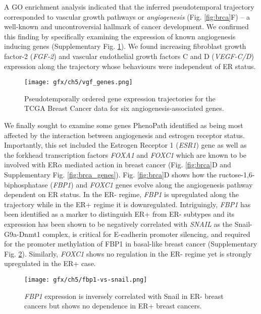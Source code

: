 A GO enrichment analysis indicated that the inferred pseudotemporal trajectory corresponded to vascular growth pathways or \emph{angiogenesis} (Fig. \ref{fig:brca}F) -- a well-known and uncontroversial hallmark of cancer development.\cite{ferrara2002vegf,welti2013recent} We confirmed this finding by specifically examining the expression of known angiogenesis inducing genes (Supplementary Fig. \ref{fig:vgf_genes}). We found increasing fibroblast growth factor-2 (\emph{FGF-2}) and vascular endothelial growth factors C and D (\emph{VEGF-C/D}) expression along the trajectory whose behaviours were independent of ER status.

\begin{figure}
   \texttt{[image: gfx/ch5/vgf\_genes.png]}
   \caption{Pseudotemporally ordered gene expression trajectories for the TCGA Breast Cancer data for six angiogenesis-associated genes.}
	\label{fig:vgf_genes}
\end{figure}

We finally sought to examine some genes PhenoPath identified as being most affected by the interaction between angiogenesis and estrogen receptor status.
Importantly, this set included the Estrogen Receptor 1 (\emph{ESR1})
gene as well as the forkhead transcription factors \emph{FOXA1} and \emph{FOXC1} which are known to be involved with ER$\alpha$ mediated action in breast cancer \cite{lam2013forkhead,yu2016foxc1} (Fig. \ref{fig:brca}D and Supplementary Fig. \ref{fig:brca_genes}).
Fig. \ref{fig:brca}D shows how the  ructose-1,6-biphosphatase (\emph{FBP1}) and \emph{FOXC1} genes evolve along the angiogenesis pathway dependent on ER status. In the ER- regime, \emph{FBP1} is upregulated along the trajectory while in the ER+ regime it is downregulated. Intriguingly, \emph{FBP1} has been identified as a marker to distinguish ER+ from ER- subtypes and its expression has been shown to be negatively correlated with \emph{SNAIL} as the Snail-G9a-Dnmt1 complex, is critical for E-cadherin promoter silencing, and required for the promoter methylation of FBP1 in basal-like breast cancer (Supplementary Fig. \ref{fig:fbp1-vs-snail}).\cite{dong2013loss} Similarly, \emph{FOXC1} shows no regulation in the ER- regime yet is strongly upregulated in the ER+ case.

\begin{figure}
  \centering
   \texttt{[image: gfx/ch5/fbp1-vs-snail.png]}
   \caption{\emph{FBP1} expression is inversely correlated with Snail in ER- breast cancers but shows no dependence in ER+ breast cancers.}
	\label{fig:fbp1-vs-snail}
\end{figure}

